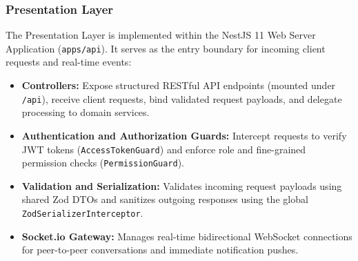 \subsubsection*{Presentation Layer}
The Presentation Layer is implemented within the NestJS 11 Web Server Application (\texttt{apps/api}). It serves as the entry boundary for incoming client requests and real-time events:
\begin{itemize}[leftmargin=*]
    \item \textbf{Controllers:} Expose structured RESTful API endpoints (mounted under \texttt{/api}), receive client requests, bind validated request payloads, and delegate processing to domain services.
    \item {\sloppy \textbf{Authentication and Authorization Guards:} Intercept requests to verify JWT tokens (\texttt{Access\allowbreak{}Token\allowbreak{}Guard}) and enforce role and fine-grained permission checks (\texttt{Permission\allowbreak{}Guard}).\par}
    \item \textbf{Validation and Serialization:} Validates incoming request payloads using shared Zod DTOs and sanitizes outgoing responses using the global \texttt{ZodSerializerInterceptor}.
    \item \textbf{Socket.io Gateway:} Manages real-time bidirectional WebSocket connections for peer-to-peer conversations and immediate notification pushes.
\end{itemize}

